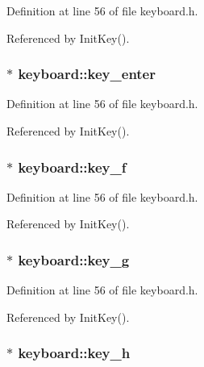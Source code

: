Definition at line 56 of file keyboard.h.

Referenced by Init\-Key().
\subsubsection{ $\ast$ {\bf keyboard::key\_\-enter}\hspace{0.3cm}{\tt  [private]}}\label{classkeyboard_keyboardr38}




Definition at line 56 of file keyboard.h.

Referenced by Init\-Key().
\subsubsection{ $\ast$ {\bf keyboard::key\_\-f}\hspace{0.3cm}{\tt  [private]}}\label{classkeyboard_keyboardr5}




Definition at line 56 of file keyboard.h.

Referenced by Init\-Key().
\subsubsection{ $\ast$ {\bf keyboard::key\_\-g}\hspace{0.3cm}{\tt  [private]}}\label{classkeyboard_keyboardr6}




Definition at line 56 of file keyboard.h.

Referenced by Init\-Key().
\subsubsection{ $\ast$ {\bf keyboard::key\_\-h}\hspace{0.3cm}{\tt  [private]}}\label{classkeyboard_keyboardr7}




